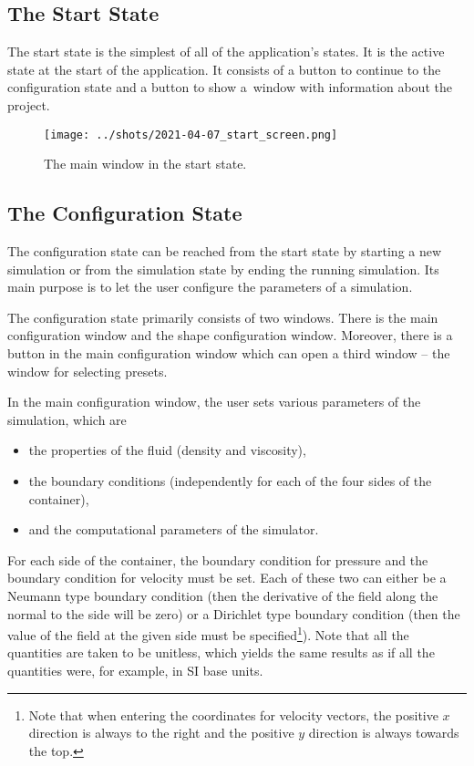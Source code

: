 \documentclass[11pt,a4paper,twoside,openright]{report}
\begin{document}
\subsection{The Start State}
The start state is the simplest of all of the application's states. It is the active state at the start of the application. It consists of a button to continue to the configuration state and a button to show a~window with information about the project.
\begin{figure}[h]
	\centering
	\texttt{[image: ../shots/2021-04-07\_start\_screen.png]}
	\caption{The main window in the start state.}
\end{figure}

\subsection{The Configuration State}
The configuration state can be reached from the start state by starting a new simulation or from the simulation state by ending the running simulation. Its main purpose is to let the user configure the parameters of a simulation.

The configuration state primarily consists of two windows. There is the main configuration window and the shape configuration window. Moreover, there is a button in the main configuration window which can open a third window -- the window for selecting presets.

In the main configuration window, the user sets various parameters of the simulation, which are
\begin{itemize}
	\item the properties of the fluid (density and viscosity),
	\item the boundary conditions (independently for each of the four sides of the container),
	\item and the computational parameters of the simulator.
\end{itemize}
For each side of the container, the boundary condition for pressure and the boundary condition for velocity must be set. Each of these two can either be a Neumann type boundary condition (then the derivative of the field along the normal to the side will be zero) or a Dirichlet type boundary condition (then the value of the field at the given side must be specified\footnote{Note that when entering the coordinates for velocity vectors, the positive $x$ direction is always to the right and the positive $y$ direction is always towards the top.}). Note that all the quantities are taken to be unitless, which yields the same results as if all the quantities were, for example, in SI base units.
\end{document}

